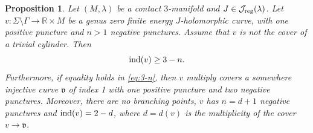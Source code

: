 \documentclass{amsart}
\newcommand{\R}{\mathbb{R}}
\newtheorem{prop}[theorem]{Proposition}
\newcommand{\ind}{\textnormal{ind}}
\begin{document}
\begin{prop} \label{A} 
Let $(M, \lambda)$ be a contact $3$-manifold and $J\in \mathcal{J}_{\rm reg}(\lambda)$. Let $v:\Sigma \setminus \Gamma \to \R \times M$ be a genus zero finite energy $J$-holomorphic curve, with one positive puncture  and $n>1$ negative punctures. Assume that $v$ is not the  cover of a trivial cylinder. Then
\begin{equation}
\ind(v) \geq 3-n.
\label{eq:3-n}
\end{equation}
Furthermore, if equality holds in \eqref{eq:3-n}, then $v$  multiply covers  a somewhere injective curve $\mathfrak{v}$ of index 1 with one positive puncture and two negative punctures. Moreover, there are no branching points, $v$ has $n=d+1$ negative punctures and $\ind(v)=2-d$, where $d=d(v)$ is the multiplicity of the cover  $v\to \mathfrak{v}$.
\end{prop}
\end{document}
